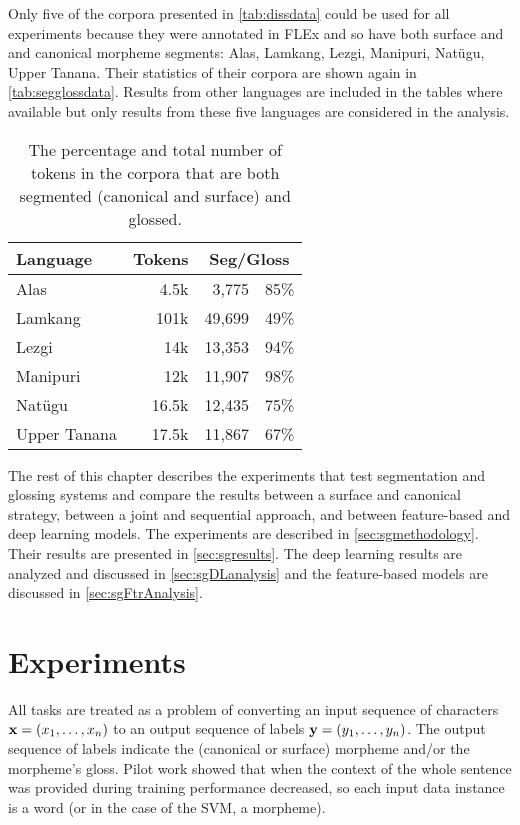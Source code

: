 Only five of the corpora presented in \autoref{tab:dissdata} could be used for all experiments because they were annotated in FLEx and so have both surface and and canonical morpheme segments: Alas, Lamkang, Lezgi, Manipuri, Nat\"ugu, Upper Tanana. Their statistics of their corpora are shown again in \autoref{tab:segglossdata}. Results from other languages are included in the tables where available but only results from these five languages are considered in the analysis. 

\begin{table}[!tb]
    \centering
    \begin{tabular}{l|r|rc}
         \textbf{Language} & \textbf{Tokens} & \multicolumn{2}{c}{\textbf{Seg/Gloss}} \\
         \hline
         Alas & 4.5k & 3,775 & 85\%  \\
         \hline
         Lamkang & 101k & 49,699 & 49\% \\
         \hline
         Lezgi & 14k & 13,353  & 94\% \\
         \hline
         Manipuri & 12k & 11,907 & 98\% \\
         \hline
         Natügu & 16.5k & 12,435 & 75\%  \\
         \hline
         Upper Tanana & 17.5k & 11,867 & 67\% 
    \end{tabular}
    \caption[Data for Segmentation and Glossing Experimentation]{The percentage and total number of tokens in the corpora that are both segmented (canonical and surface) and glossed.}
    \label{tab:segglossdata}
\end{table}

The rest of this chapter describes the experiments that test segmentation and glossing systems and compare the results between a surface and canonical strategy, between a joint and sequential approach, and between feature-based and deep learning models. The experiments are described in \autoref{sec:sgmethodology}. Their results are presented in \autoref{sec:sgresults}. The deep learning results are analyzed and discussed in \autoref{sec:sgDLanalysis} and the feature-based models are discussed in \autoref{sec:sgFtrAnalysis}. 


\section{Experiments}
\label{sec:sgmethodology}

All tasks are treated as a problem of converting an input sequence of characters $\mathbf{x} = (x_1, \ldots, x_n)$ to an output sequence of labels $\mathbf{y} = (y_1, \ldots, y_n)$. The output sequence of labels indicate the (canonical or surface) morpheme and/or the morpheme's gloss. Pilot work showed that when the context of the whole sentence was provided during training performance decreased, so each input data instance is a word (or in the case of the SVM, a morpheme). 

